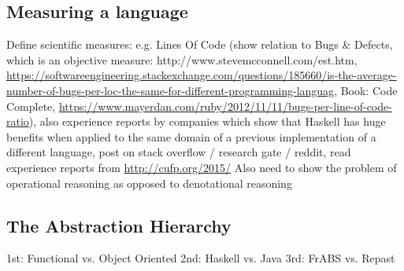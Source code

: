 \subsection{Measuring a language}
Define scientific measures: e.g. Lines Of Code (show relation to Bugs \& Defects, which is an objective measure: http://www.stevemcconnell.com/est.htm, \url{https://softwareengineering.stackexchange.com/questions/185660/is-the-average-number-of-bugs-per-loc-the-same-for-different-programming-languag}, Book: Code Complete, \url{https://www.mayerdan.com/ruby/2012/11/11/bugs-per-line-of-code-ratio}), also experience reports by companies which show that Haskell has huge benefits when applied to the same domain of a previous implementation of a different language, post on stack overflow / research gate / reddit, read experience reports from \url{http://cufp.org/2015/} Also need to show the problem of operational reasoning as opposed to denotational reasoning

\subsection{The Abstraction Hierarchy}

1st: Functional vs. Object Oriented
2nd: Haskell vs. Java
3rd: FrABS vs. Repast